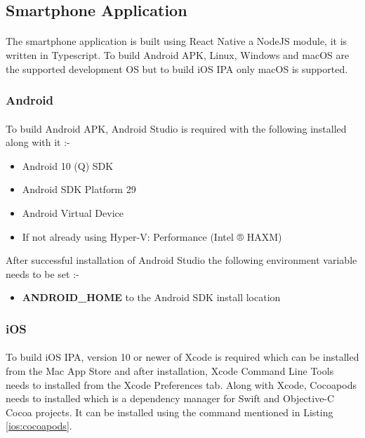 \documentclass{article}
\begin{document}
    \subsection{Smartphone Application}
        \paragraph{}
        The smartphone application is built using React Native a NodeJS module, it is written in Typescript. To build Android APK, Linux, Windows and macOS are the supported development OS but to build iOS IPA only macOS is supported.
        \subsubsection{Android}
            \paragraph{}
            To build Android APK, Android Studio is required with the following installed along with it :- 
            \begin{itemize}
                \item Android 10 (Q) SDK
                \item Android SDK Platform 29
                \item Android Virtual Device
                \item If not already using Hyper-V: Performance (Intel ® HAXM)
            \end{itemize}
            After successful installation of Android Studio the following environment variable needs to be set :-
            \begin{itemize}
                \item \textbf{ANDROID\_HOME} to the Android SDK install location
            \end{itemize}
        
        \subsubsection{iOS}
            \paragraph{}
            To build iOS IPA, version 10 or newer of Xcode is required which can be installed from the Mac App Store and after installation, Xcode Command Line Tools needs to installed from the Xcode Preferences tab. Along with Xcode, Cocoapods needs to installed which is a dependency manager for Swift and Objective-C Cocoa projects. It can be installed using the command mentioned in Listing \ref{ios:cocoapods}.
        
\end{document}

